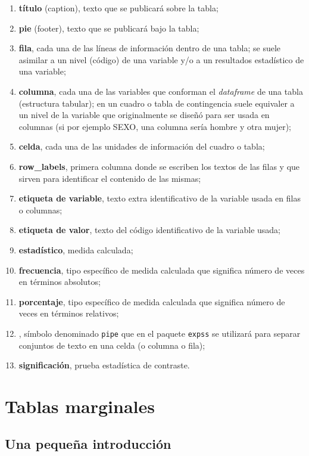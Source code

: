 \documentclass[
]{book}
\providecommand{\tightlist}{%
  \setlength{\itemsep}{0pt}\setlength{\parskip}{0pt}}
\begin{document}
\begin{enumerate}
\def\labelenumi{\arabic{enumi}.}
\tightlist
\item
  \textbf{título} (caption), texto que se publicará sobre la tabla;
\item
  \textbf{pie} (footer), texto que se publicará bajo la tabla;
\item
  \textbf{fila}, cada una de las líneas de información dentro de una tabla; se suele asimilar a un nivel (código) de una variable y/o a un resultados estadístico de una variable;
\item
  \textbf{columna}, cada una de las variables que conforman el \emph{dataframe} de una tabla (estructura tabular); en un cuadro o tabla de contingencia suele equivaler a un nivel de la variable que originalmente se diseñó para ser usada en columnas (si por ejemplo SEXO, una columna sería hombre y otra mujer);
\item
  \textbf{celda}, cada una de las unidades de información del cuadro o tabla;
\item
  \textbf{row\_labels}, primera columna donde se escriben los textos de las filas y que sirven para identificar el contenido de las mismas;
\item
  \textbf{etiqueta de variable}, texto extra identificativo de la variable usada en filas o columnas;
\item
  \textbf{etiqueta de valor}, texto del código identificativo de la variable usada;
\item
  \textbf{estadístico}, medida calculada;
\item
  \textbf{frecuencia}, tipo específico de medida calculada que significa número de veces en términos absolutos;
\item
  \textbf{porcentaje}, tipo específico de medida calculada que significa número de veces en términos relativos;
\item
  \textbf{\texttt{\textbar{}}}, símbolo denominado \texttt{pipe} que en el paquete \texttt{expss} se utilizará para separar conjuntos de texto en una celda (o columna o fila);
\item
  \textbf{significación}, prueba estadística de contraste.
\end{enumerate}

\hypertarget{tse03}{%
\chapter{Tablas marginales}\label{tse03}}

\hypertarget{una-pequeuxf1a-introducciuxf3n}{%
\section{Una pequeña introducción}\label{una-pequeuxf1a-introducciuxf3n}}
\end{document}
